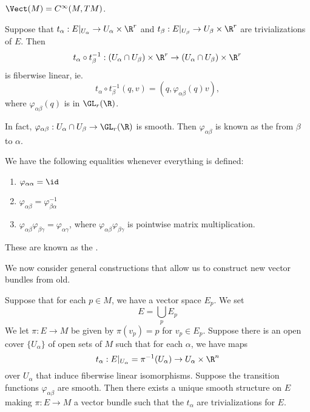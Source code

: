 \documentclass[a4paper]{article}
\begin{document}
\begin{eg}
  $\Vect(M) = C^\infty (M, TM)$.
\end{eg}

\begin{defi}
  Suppose that $t_\alpha: E|_{U_\alpha} \to U_\alpha \times \R^r$ and $t_\beta: E|_{U_\beta} \to U_\beta \times \R^r$ are trivializations of $E$. Then
  \[
    t_\alpha \circ t_\beta^{-1} : (U_\alpha \cap U_\beta) \times \R^r \to (U_\alpha \cap U_\beta) \times \R^r
  \]
  is fiberwise linear, ie.
  \[
    t_\alpha \circ t_\beta^{-1}(q, v) = (q, \varphi_{\alpha\beta}(q) v),
  \]
  where $\varphi_{\alpha\beta}(q)$ is in $\GL_r(\R)$.

  In fact, $\varphi_{\alpha\beta}: U_\alpha \cap U_\beta \to \GL_r(\R)$ is smooth. Then $\varphi_{\alpha\beta}$ is known as the  from $\beta$ to $\alpha$.
\end{defi}

\begin{prop}
  We have the following equalities whenever everything is defined:
  \begin{enumerate}
    \item $\varphi_{\alpha\alpha} = \id$
    \item $\varphi_{\alpha\beta} = \varphi_{\beta\alpha}^{-1}$
    \item $\varphi_{\alpha\beta}\varphi_{\beta\gamma} = \varphi_{\alpha\gamma}$, where $\varphi_{\alpha\beta} \varphi_{\beta\gamma}$ is pointwise matrix multiplication.
  \end{enumerate}
  These are known as the .
\end{prop}
We now consider general constructions that allow us to construct new vector bundles from old.

\begin{prop}
  Suppose that for each $p \in M$, we have a vector space $E_p$. We set
  \[
    E = \bigcup_p E_p
  \]
  We let $\pi: E \to M$ be given by $\pi(v_p) = p$ for $v_p \in E_p$. Suppose there is an open cover $\{U_\alpha\}$ of open sets of $M$ such that for each $\alpha$, we have maps
  \[
    t_\alpha: E|_{U_\alpha} = \pi^{-1}(U_\alpha) \to U_\alpha \times \R^n
  \]
  over $U_\alpha$ that induce fiberwise linear isomorphisms. Suppose the transition functions $\varphi_{\alpha\beta}$ are smooth. Then there exists a unique smooth structure on $E$ making $\pi: E \to M$ a vector bundle such that the $t_\alpha$ are trivializations for $E$.
\end{prop}
\end{document}
